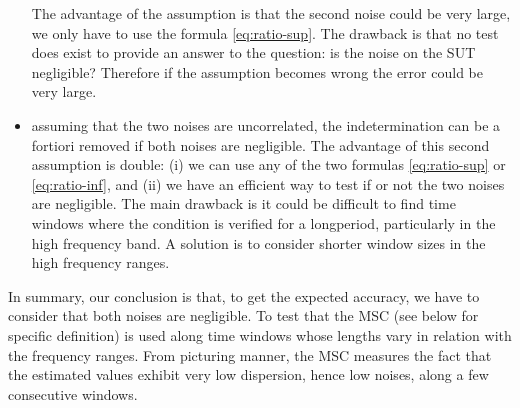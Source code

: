 \begin{itemize}
The advantage of the  assumption is that the second noise could be very large, we only have to use the formula \eqref{eq:ratio-sup}. The drawback is that no test does exist to provide an answer to the question: is the noise on the SUT negligible? Therefore if the assumption becomes wrong the error could be very large.

\item
assuming that the two noises are uncorrelated, the indetermination can be a fortiori removed if both noises are negligible. The advantage of this second assumption is double: (i) we can use any of the two formulas \eqref{eq:ratio-sup} or \eqref{eq:ratio-inf}, and (ii) we have an efficient way to test if or not the two noises are negligible. The main drawback is it could be difficult to find time windows where the condition is verified for a longperiod, particularly in the high frequency band. A solution is to consider shorter window sizes in the high frequency ranges. 



\end{itemize}

In summary, our conclusion is that, to get the expected accuracy, we have to consider that both noises are negligible. To test that the MSC (see below for specific definition) is used along time windows whose lengths vary in relation with the frequency ranges. From picturing manner, the MSC measures the fact that the estimated values exhibit very low dispersion, hence low noises, along a few consecutive windows. 
 
